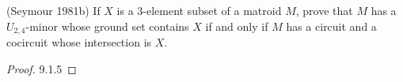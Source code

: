 \prob
{
    (Seymour 1981b) If $X$ is a 3-element subset of a matroid $M$, prove that $M$ has a $U_{2,4}$-minor whose ground set
    contains $X$ if and only if $M$ has a circuit and a cocircuit whose intersection is $X$.
}
\begin{proof}
	9.1.5
\end{proof}
